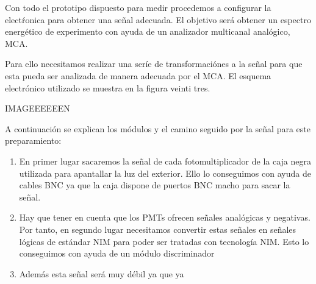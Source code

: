 Con todo el prototipo dispuesto para medir procedemos a configurar la electŕonica para obtener una señal adecuada. El objetivo será obtener un espectro energético de experimento con ayuda de un analizador multicanal analógico, MCA. 

Para ello necesitamos realizar una seríe de transformaciónes a la señal para que esta pueda ser analizada de manera adecuada por el MCA. El esquema electrónico utilizado se muestra en la figura veinti tres.

IMAGEEEEEEN

A continuación se explican los módulos y el camino seguido por la señal para este preparamiento:
\begin{enumerate} 
\item{} En primer lugar sacaremos la señal de cada fotomultiplicador de la caja negra utilizada para apantallar la luz del exterior. Ello lo conseguimos con ayuda de cables BNC  ya que la caja dispone de puertos BNC macho para sacar la señal. 

\item{} Hay que tener en cuenta que los PMTs ofrecen señales analógicas y negativas. Por tanto, en segundo lugar necesitamos convertir estas señales en señales lógicas de estándar NIM para poder ser tratadas con tecnología NIM. Esto lo conseguimos con ayuda de un módulo discriminador 

\item{} Además esta señal será muy débil ya que ya 

\end{enumerate}



